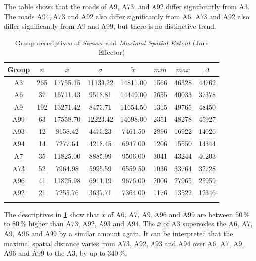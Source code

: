 The table shows that the roads of A9, A73, and A92 differ significantly from A3. The roads A94, A73 and A92 also differ significantly from A6. A73 and A92 also differ significantly from A9 and A99, but there is no distinctive trend.
\begin{table}[ht]
	\tiny
	\centering
	\begin{tabular}{c|c|c|c|c|c|c|c}
		\toprule
		Group & $n$ & $\bar{x}$ & $\sigma$ & $\tilde{x}$ & $min$ & $max$ & $\Delta$ \\
		\midrule
		A3   & 265 & 17755.15 & 11139.22 & 14811.00 & 1566 & 46328 & 44762 \\ 
		A6   & 37  & 16711.43 & 9518.81  & 14449.00 & 2655 & 40033 & 37378 \\ 
		A9   & 192 & 13271.42 & 8473.71  & 11654.50 & 1315 & 49765 & 48450 \\ 
		A99  & 63  & 17558.70 & 12223.42 & 14698.00 & 2351 & 48278 & 45927 \\ 
		A93  & 12  & 8158.42  & 4473.23  & 7461.50  & 2896 & 16922 & 14026 \\ 
		A94  & 14  & 7277.64  & 4218.45  & 6947.00  & 1206 & 15550 & 14344 \\ 
		A7   & 35  & 11825.00 & 8885.99  & 9506.00  & 3041 & 43244 & 40203 \\ 
		A73  & 52  & 7964.98  & 5995.59  & 6559.50  & 1036 & 33764 & 32728 \\ 
		A96  & 41  & 11825.98 & 6911.19  & 9676.00  & 2006 & 27965 & 25959 \\ 
		A92  & 21  & 7255.76  & 3637.71  & 7364.00  & 1176 & 13522 & 12346 \\ 
		\bottomrul
	  \end{tabular}
    \caption{Group descriptives of \textit{Strasse} and \textit{Maximal Spatial Extent} (Jam Effector)}
    \label{tbl:descriptives_baysis_effector_Strasse_SMax}
\end{table}
The descriptives in \cref{tbl:descriptives_baysis_effector_Strasse_SMax} show that $\bar{x}$ of A6, A7, A9, A96 and A99 are between 50\,\% to 80\,\% higher than A73, A92, A93 and A94. The $\bar{x}$ of A3 supersedes the A6, A7, A9, A96 and A99 by a similar amount again. It can be interpreted that the maximal spatial distance varies from A73, A92, A93 and A94 over A6, A7, A9, A96 and A99 to the A3, by up to 340\,\%.


